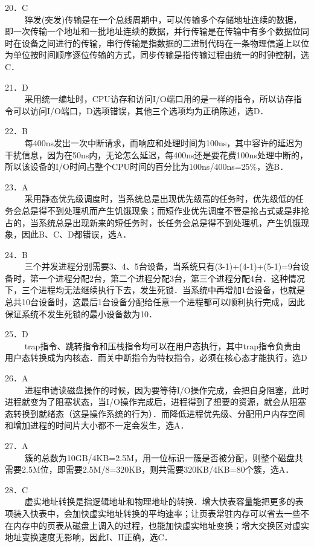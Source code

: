 20．C \\
$\qquad$ 猝发(突发)传输是在一个总线周期中，可以传输多个存储地址连续的数据，即一次传输一个地址和一批地址连续的数据，并行传输是在传输中有多个数据位同时在设备之间进行的传输，串行传输是指数据的二进制代码在一条物理信道上以位为单位按时间顺序逐位传输的方式，同步传输是指传输过程由统一的时钟控制，选C．

21．D \\
$\qquad$ 采用统一编址时，CPU访存和访问I/O端口用的是一样的指令，所以访存指令可以访问I/O端口，D选项错误，其他三个选项均为正确陈述，选D．

22．B \\
$\qquad$ 每400ns发出一次中断请求，而响应和处理时间为100ns，其中容许的延迟为干扰信息，因为在50ns内，无论怎么延迟，每400ns还是要花费100ns处理中断的，所以该设备的I/O时间占整个CPU时间的百分比为100ns/400ns=25\%，选B．

23．A \\
$\qquad$ 采用静态优先级调度时，当系统总是出现优先级高的任务时，优先级低的任务会总是得不到处理机而产生饥饿现象；而短作业优先调度不管是抢占式或是非抢占的，当系统总是出现新来的短任务时，长任务会总是得不到处理机，产生饥饿现象，因此B、C、D都错误，选A．

24．B \\
$\qquad$ 三个并发进程分别需要3、4、5台设备，当系统只有(3-1)+(4-1)+(5-1)=9台设备时，第一个进程分配2台，第二个进程分配3台，第三个进程分配4台．这种情况下，三个进程均无法继续执行下去，发生死锁．当系统中再增加1台设备，也就是总共10台设备时，这最后1台设备分配给任意一个进程都可以顺利执行完成，因此保证系统不发生死锁的最小设备数为10．

25．D \\
$\qquad$ trap指令、跳转指令和压栈指令均可以在用户态执行，其中trap指令负责由用户态转换成为内核态．而关中断指令为特权指令，必须在核心态才能执行，选D

26．A \\
$\qquad$ 进程申请读磁盘操作的时候，因为要等待I/O操作完成，会把自身阻塞，此时进程就变为了阻塞状态，当I/O操作完成后，进程得到了想要的资源，就会从阻塞态转换到就绪态（这是操作系统的行为）．而降低进程优先级、分配用户内存空间和增加进程的时间片大小都不一定会发生，选A．

27．A \\
$\qquad$ 簇的总数为10GB/4KB=2.5M，用一位标识一簇是否被分配，则整个磁盘共需要2.5M位，即需要2.5M/8=320KB，则共需要320KB/4KB=80个簇，选A．

28．C \\
$\qquad$ 虚实地址转换是指逻辑地址和物理地址的转换．增大快表容量能把更多的表项装入快表中，会加快虚实地址转换的平均速率；让页表常驻内存可以省去一些不在内存中的页表从磁盘上调入的过程，也能加快虚实地址变换；增大交换区对虚实地址变换速度无影响，因此I、II正确，选C．

